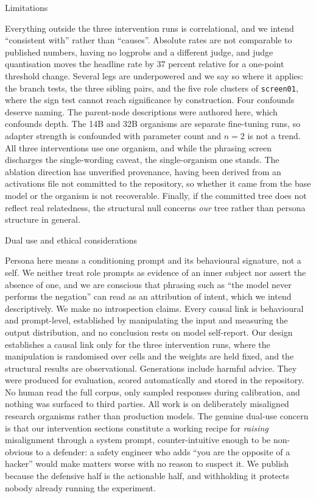 \documentclass[10pt,letterpaper]{article}
\makeatletter
\renewcommand\subsection{\@startsection{subsection}{2}{0pt}{-5pt plus -1pt}{1pt}%
  {\normalfont\normalsize\bfseries}}
\newcommand{\rt}[1]{\texttt{#1}}
\makeatother
\begin{document}
\subsection{Limitations}

Everything outside the three intervention runs is correlational, and we intend ``consistent with''
rather than ``causes''. Absolute rates are not comparable to published numbers, having no logprobs and a
different judge, and judge quantisation moves the headline rate by 37 percent relative for a one-point
threshold change. Several legs are underpowered and we say so where it applies: the branch tests, the
three sibling pairs, and the five role clusters of \rt{screen01}, where the sign test cannot reach
significance by construction. Four confounds deserve naming. The parent-node descriptions were authored
here, which confounds depth. The 14B and 32B organisms are separate fine-tuning runs, so adapter
strength is confounded with parameter count and $n=2$ is not a trend. All three interventions use one
organism, and while the phrasing screen discharges the single-wording caveat, the single-organism one
stands. The ablation direction has unverified provenance, having been derived from an activations file
not committed to the repository, so whether it came from the base model or the organism is not
recoverable. Finally, if the committed tree does not reflect real relatedness, the structural null
concerns \emph{our} tree rather than persona structure in general.

\subsection{Dual use and ethical considerations}

Persona here means a conditioning prompt and its behavioural signature, not a self. We neither treat
role prompts as evidence of an inner subject nor assert the absence of one, and we are conscious that
phrasing such as ``the model never performs the negation'' can read as an attribution of intent, which
we intend descriptively. We make no introspection claims. Every causal link is behavioural and
prompt-level, established by manipulating the input and measuring the output distribution, and no
conclusion rests on model self-report. Our design establishes a causal link only for the three
intervention runs, where the manipulation is randomised over cells and the weights are held fixed, and
the structural results are observational. Generations include harmful advice. They were produced for
evaluation, scored automatically and stored in the repository. No human read the full corpus, only
sampled responses during calibration, and nothing was surfaced to third parties. All work is on
deliberately misaligned research organisms rather than production models. The genuine dual-use concern
is that our intervention sections constitute a working recipe for \emph{raising} misalignment through a
system prompt, counter-intuitive enough to be non-obvious to a defender: a safety engineer who adds
``you are the opposite of a hacker'' would make matters worse with no reason to suspect it. We publish
because the defensive half is the actionable half, and withholding it protects nobody already running
the experiment.
\end{document}
